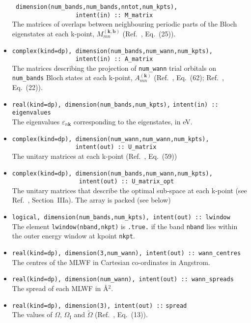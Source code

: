 \begin{itemize}
      \verb# dimension(num_bands,num_bands,nntot,num_kpts),#\\
      \verb#                  intent(in) :: M_matrix#\\ 
      The matrices of overlaps between neighbouring periodic parts of
      the Bloch eigenstates at each k-point, $M_{mn}^{(\mathbf{k,b})}$
      (Ref.~\cite{MV}, Eq.~(25)).
\item \verb#complex(kind=dp), dimension(num_bands,num_wann,num_kpts),#\\
      \verb#                  intent(in) :: A_matrix# \\The matrices
      describing the projection of \verb#num_wann# trial orbitals on
      \verb#num_bands# Bloch states at each k-point,
      $A_{mn}^{(\mathbf{k})}$ (Ref.~\cite{MV}, Eq.~(62);
      Ref.~\cite{SMV}, Eq.~(22)).
\item \verb#real(kind=dp), dimension(num_bands,num_kpts),#
      \verb#intent(in) :: eigenvalues#\\ The
      eigenvalues $\varepsilon_{n\mathbf{k}}$ corresponding to the
      eigenstates, in eV.
\item \verb#complex(kind=dp), dimension(num_wann,num_wann,num_kpts),#\\
      \verb#                  intent(out) :: U_matrix#\\ The unitary
      matrices at each k-point (Ref.~\cite{MV}, Eq.~(59))
\item \verb#complex(kind=dp), dimension(num_bands,num_wann,num_kpts),#\\
      \verb#                   intent(out) :: U_matrix_opt#\\ The
      unitary matrices that describe the optimal sub-space at each
      k-point (see Ref.~\cite{SMV}, Section~{\sc IIIa}). The array is
      packed (see below) 
\item \verb#logical, dimension(num_bands,num_kpts), intent(out) :: lwindow#\\ 
       The element \verb#lwindow(nband,nkpt)# is {\tt .true.} if the band
{\tt nband} lies within the outer energy window at kpoint {\tt nkpt}.
\item \verb#real(kind=dp), dimension(3,num_wann), intent(out) :: wann_centres#\\   
      The centres of the MLWF in Cartesian co-ordinates in Angstrom. 
\item \verb#real(kind=dp), dimension(num_wann), intent(out) :: wann_spreads#\\ 
      The spread of each MLWF in \AA$^{2}$.
\item \verb#real(kind=dp), dimension(3), intent(out) ::#
      \verb#spread#\\ 
      The values of $\Omega$, $\Omega_{\mathrm{I}}$ and
      $\tilde{\Omega}$ (Ref.~\cite{MV}, Eq.~(13)). 
\end{itemize}

